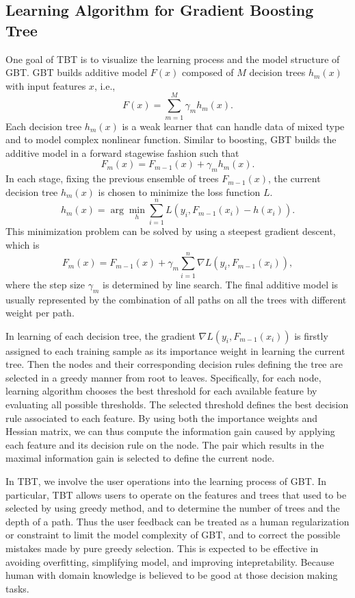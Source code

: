 \documentclass{chi2009}
\begin{document}
\subsection{Learning Algorithm for Gradient Boosting Tree}

One goal of TBT is to visualize the learning process and the model structure of GBT. GBT builds additive model $F(x)$ composed of $M$ decision trees $h_m(x)$ with input features $x$, i.e., 
\begin{equation}
F(x)=\sum_{m=1}^M \gamma_mh_m(x).
\end{equation}
Each decision tree $h_m(x)$ is a weak learner that can handle data of mixed type and to model complex nonlinear function. Similar to boosting, GBT builds the additive model in a forward stagewise fashion such that
\begin{equation}
F_m(x)=F_{m-1}(x)+\gamma_mh_m(x).
\end{equation}
In each stage, fixing the previous ensemble of trees $F_{m-1}(x)$, the current decision tree $h_m(x)$ is chosen to minimize the loss function $L$.
\begin{equation}
h_m(x)=\arg\min_h\sum_{i=1}^n L(y_i, F_{m-1}(x_i)-h(x_i)).
\end{equation}
This minimization problem can be solved by using a steepest gradient descent, which is
\begin{equation}
F_m(x)=F_{m-1}(x)+\gamma_m\sum_{i=1}^n\nabla L(y_i, F_{m-1}(x_i)),
\end{equation}
where the step size $\gamma_m$ is determined by line search. The final additive model is usually represented by the combination of all paths on all the trees with different weight per path.

In learning of each decision tree, the gradient $\nabla L(y_i, F_{m-1}(x_i))$ is firstly assigned to each training sample as its importance weight in learning the current tree. Then the nodes and their corresponding decision rules defining the tree are selected in a greedy manner from root to leaves. Specifically, for each node, learning algorithm chooses the best threshold for each available feature by evaluating all possible thresholds. The selected threshold defines the best decision rule associated to each feature. By using both the importance weights and Hessian matrix, we can thus compute the information gain caused by applying each feature and its decision rule on the node. The pair which results in the maximal information gain is selected to define the current node. 

In TBT, we involve the user operations into the learning process of GBT. In particular, TBT allows users to operate on the features and trees that used to be selected by using greedy method, and to determine the number of trees and the depth of a path. Thus the user feedback can be treated as a human regularization or constraint to limit the model complexity of GBT, and to correct the possible mistakes made by pure greedy selection. This is expected to be effective in avoiding overfitting, simplifying model, and improving intepretability. Because human with domain knowledge is believed to be good at those decision making tasks. 
\end{document}
